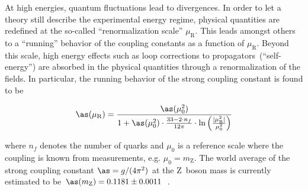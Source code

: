 
At high energies, quantum fluctuations lead to divergences. In order to let a theory still describe the experimental energy regime, physical quantities are redefined at the so-called ``renormalization scale'' $\mu_\mathrm{R}$. This leads amongst others to a ``running'' behavior of the coupling constants as a function of $\mu_\mathrm{R}$. Beyond this scale, high energy effects such as loop corrections to propagators~(``self-energy'') are absorbed in the physical quantities through a renormalization of the fields. In particular, the running behavior of the strong coupling constant is found to be 

\begin{equation}
\as(\mu_\mathrm{R})=\frac{\as(\mu_{0}^{2})}{1+\as(\mu_\mathrm{0}^2)\cdot\tfrac{33-2\cdot n_f}{12\pi}\cdot\ln\Big(\tfrac{|\mu_\mathrm{R}^2|}{\mu_{0}^{2}}\Big)}
\end{equation}

where $n_f$ denotes the number of quarks and $\mu_{0}$ is a reference scale where the coupling is known from measurements, e.g. $\mu_{0}=m_\mathrm{Z}$. The world average of the strong coupling constant $\as=g/(4\pi^2)$ at the $\mathrm{Z}$~boson mass is currently estimated to be $\as(m_\mathrm{Z})=0.1181\pm0.0011$~\cite{Olive:2016xmw}. 

